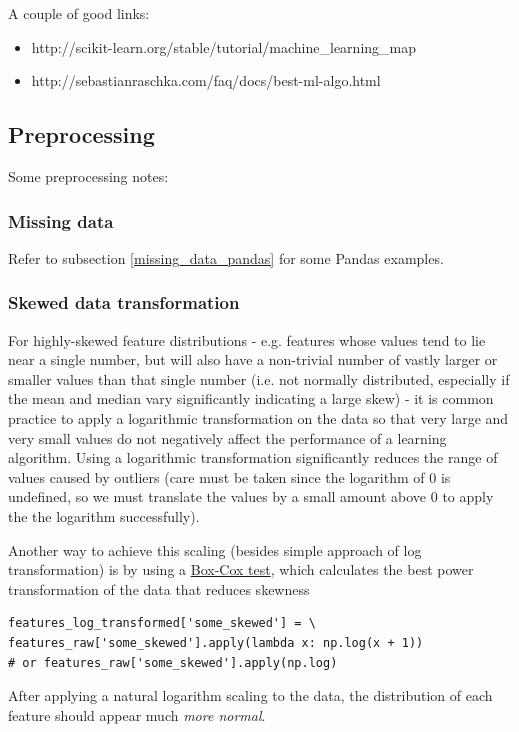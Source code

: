 \documentclass[11pt]{article}
\begin{document}
A couple of good links:
\begin{itemize}
	\item http://scikit-learn.org/stable/tutorial/machine\_learning\_map
	\item http://sebastianraschka.com/faq/docs/best-ml-algo.html
\end{itemize}

\subsection{Preprocessing}
Some preprocessing notes:

\subsubsection*{Missing data}
Refer to subsection \ref{missing_data_pandas} for some Pandas examples.

\subsubsection*{Skewed data transformation}
For highly-skewed feature distributions - e.g. features whose values tend to lie near a single number, but will also have a non-trivial number of vastly larger or smaller values than that single number (i.e. not normally distributed, especially if the mean and median vary significantly indicating a large skew) - it is common practice to apply a  logarithmic transformation on the data so that very large and very small values do not negatively affect the performance of a learning algorithm. Using a logarithmic transformation significantly reduces the range of values caused by outliers (care must be taken since the logarithm of 0 is undefined, so we must translate the values by a small amount above 0 to apply the the logarithm successfully).

Another way to achieve this scaling (besides simple approach of log transformation)  is by using a \href{https://scipy.github.io/devdocs/generated/scipy.stats.boxcox.html}{Box-Cox test}, which calculates the best power transformation of the data that reduces skewness 
\begin{lstlisting}
features_log_transformed['some_skewed'] = \
features_raw['some_skewed'].apply(lambda x: np.log(x + 1))
# or features_raw['some_skewed'].apply(np.log)
\end{lstlisting}
After applying a natural logarithm scaling to the data, the distribution of each feature should appear much \textit{more normal}.
\end{document}
